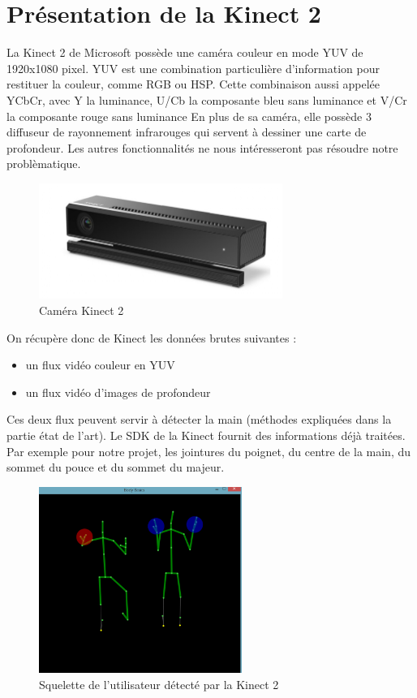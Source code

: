 \section{Présentation de la Kinect 2}
La Kinect 2 de Microsoft possède une caméra couleur en mode YUV de 1920x1080 pixel.
YUV est une combination particulière d'information pour restituer la couleur, comme RGB ou HSP.
Cette combinaison aussi appelée YCbCr, avec Y la luminance, U/Cb la composante bleu sans luminance et V/Cr la composante rouge sans luminance
En plus de sa caméra, elle possède 3 diffuseur de rayonnement infrarouges qui servent à dessiner une carte de profondeur.
Les autres fonctionnalités ne nous intéresseront pas résoudre notre problèmatique.\\

\begin{figure}[H]
 \center
 \includegraphics[width=300px]{images/kinect-v2.png}
 \caption{Caméra Kinect 2}
\end{figure}

On récupère donc de Kinect les données brutes suivantes : 
\begin{itemize}
 \item un flux vidéo couleur en YUV
 \item un flux vidéo d'images de profondeur
\end{itemize}

Ces deux flux peuvent servir à détecter la main (méthodes expliquées dans la partie état de l'art).
Le SDK de la Kinect fournit des informations déjà traitées. 
Par exemple pour notre projet, les jointures du poignet, du centre de la main, du sommet du pouce et du sommet du majeur.

\begin{figure}[H]
\center
\includegraphics[width=250px]{images/kinec2_skel.png}
\caption{Squelette de l'utilisateur détecté par la Kinect 2}
\label{fig:skeleton_kinect2}
\end{figure}

